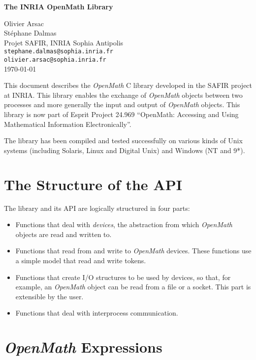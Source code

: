 \documentclass{article}
\newcommand{\OM}{{\sl OpenMath}}
\begin{document}
 

\begin{center} 
{\LARGE
{\bf The INRIA OpenMath Library}
}
\end{center} 

\begin{center} 
Olivier Arsac\\
St\'ephane Dalmas\\
Projet SAFIR, INRIA Sophia Antipolis\\
{\tt stephane.dalmas@sophia.inria.fr} \\
{\tt olivier.arsac@sophia.inria.fr}\\
\vspace{0.4cm}
\today{}
\end{center} 
\vspace{1cm}

This document describes the {\OM} C library developed in the SAFIR project at
INRIA. This library enables the exchange of {\OM} objects between two
processes and more generally the input and output of {\OM} objects. This
library is now part of Esprit Project 24.969 ``OpenMath: Accessing and Using
Mathematical Information Electronically''.

The library has been compiled and tested successfully on various kinds of
Unix systems (including Solaris, Linux and Digital Unix) and Windows
(NT and 9*).

\section{The Structure of the API}

The library and its API are logically structured in four parts:
\begin{itemize} 
\item Functions that deal with {\sl devices}, the abstraction
from which {\OM} objects are read and written to.
\item Functions that read from and write to {\OM} devices. These functions 
use a simple model that read and write tokens.
\item Functions that create I/O  structures to be used by devices, so that,
for example, an {\OM} object can be read from a file or a socket. This part
is extensible by the user. 
\item Functions that deal with interprocess communication.
\end{itemize} 

\section{{\OM} Expressions}
\end{document}
